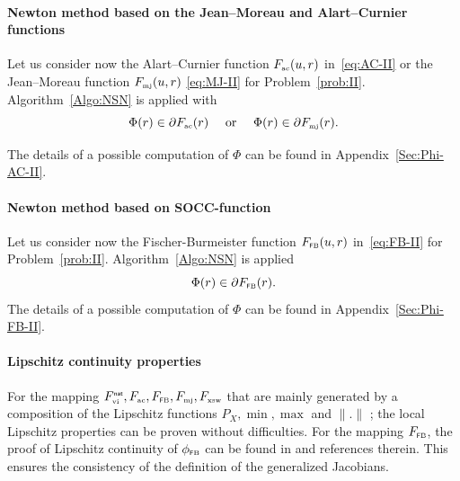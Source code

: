 {\paragraph{Newton method based on the Jean--Moreau and  Alart--Curnier functions}
\label{Sec:NSN-AC}


Let us consider now the Alart--Curnier function $F_{{\hbox{\tiny{ac}}}}(u,r)$ in~\eqref{eq:AC-II} or the Jean--Moreau function $F_{{\hbox{\tiny{mj}}}}(u,r)$ \eqref{eq:MJ-II} for Problem~\ref{prob:II}. 
Algorithm~\ref{Algo:NSN} is applied with
\begin{equation}  \label{eq:phiphi-ac}
    \Phi(r) \in \partial F_{\actwo}(r)\quad\text{ or } \quad   \Phi(r) \in \partial F_{\mjtwo}(r).
\end{equation}}
The details of a possible computation of $\Phi$ can be found in Appendix~\ref{Sec:Phi-AC-II}.

\paragraph{Newton method based on  SOCC-function}
\label{Sec:Num-SOCCP}
Let us consider now the Fischer-Burmeister function $F_{{\hbox{\tiny{\textsf FB}}}}(u,r)$ in~\eqref{eq:FB-II} for Problem~\ref{prob:II}.
Algorithm~\ref{Algo:NSN} is applied 
\begin{equation}  \label{eq:phiphi-ac}
    \Phi(r) \in \partial F_{\fb}(r).
\end{equation}
The details of a possible computation of $\Phi$ can be found in Appendix~\ref{Sec:Phi-FB-II}.


\paragraph{Lipschitz continuity properties} For the mapping $F^{\hbox{\sf \tiny{nat}}}_{\hbox{\tiny{vi}}}, F_{\hbox{\tiny{ac}}}, F_{{\hbox{\tiny{\textsf FB}}}}, F_{{\hbox{\tiny{mj}}}}, F_{{\hbox{\tiny{xsw}}}}$ that are mainly generated by a composition of the Lipschitz functions $P_X,\min,\max$ and $\|.\|$ ; the local Lipschitz properties can be proven without difficulties. For the mapping  $F_{{\hbox{\tiny{\textsf FB}}}}$, the proof of Lipschitz continuity of $\phi_{\hbox{\tiny{\textsf FB}}}$ can be found in \citep{Sun.Sun_MP2005} and references therein. This ensures the consistency of the definition of the generalized Jacobians.


